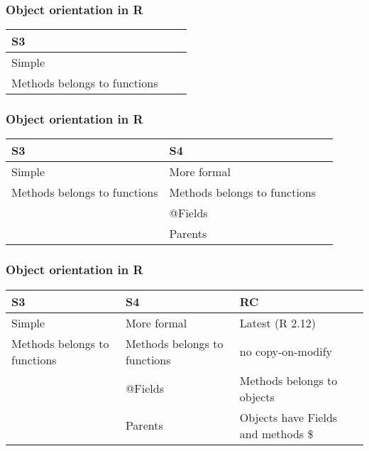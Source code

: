 \documentclass{beamer}
\begin{document}
\begin{frame}
	\frametitle{Object orientation in R}
	\begin{center}
		\begin{table}
			\begin{tabular}{p{3cm} p{3cm} p{3cm}}
				S3 &  &  \\
				\hline
				\hline
				Simple &  &  \\
				\hline
				Methods belongs to functions &  & \\
				\hline
			\end{tabular}
		\end{table}
	\end{center}
\end{frame}

\begin{frame}
	\frametitle{Object orientation in R}
	\begin{center}
		\begin{table}
			\begin{tabular}{p{3cm} p{3cm} p{3cm}}
				S3 & S4 &  \\
				\hline
				\hline
				Simple & More formal &  \\
				\hline
				Methods belongs to functions & Methods belongs to functions & 
				 \\
				\hline
				& @Fields & \\
				\hline
				& Parents & \\
			\end{tabular}
		\end{table}
	\end{center}
\end{frame}

\begin{frame}
	\frametitle{Object orientation in R}
	\begin{center}
		\begin{table}
			\begin{tabular}{p{3cm} p{3cm} p{3cm}}
				S3 & S4 & RC \\
				\hline
				\hline
				Simple & More formal & Latest (R 2.12) \\
				\hline
				Methods belongs to functions & Methods belongs to functions & 
				no copy-on-modify \\
				\hline
				& @Fields & Methods belongs to objects \\
				\hline
				& Parents & Objects have Fields and methods \$ \\
			\end{tabular}
		\end{table}
	\end{center}
\end{frame}
\end{document}
